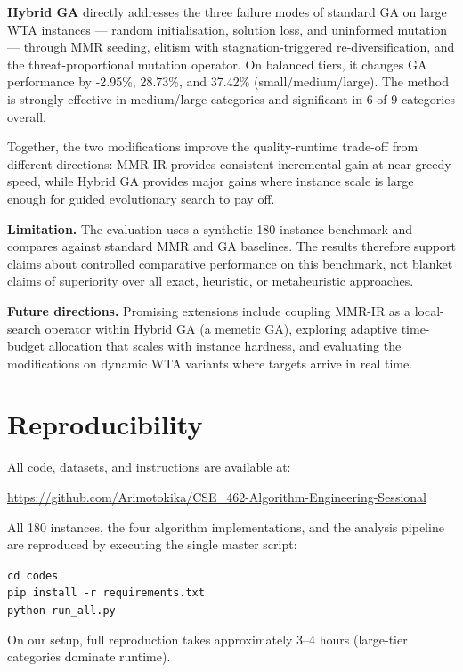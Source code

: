 \documentclass[10pt,conference]{IEEEtran}
\begin{document}
\textbf{Hybrid GA} directly addresses the three failure modes of standard GA
on large WTA instances --- random initialisation, solution loss, and uninformed
mutation --- through MMR seeding, elitism with stagnation-triggered
re-diversification, and the
threat-proportional mutation operator.  On balanced tiers, it changes
GA performance by -2.95\%, 28.73\%, and 37.42\% (small/medium/large).  The
method is strongly effective in medium/large categories and significant in
6 of 9 categories overall.

Together, the two modifications improve the quality-runtime trade-off from
different directions: MMR-IR provides consistent incremental gain at near-greedy
speed, while Hybrid GA provides major gains where instance scale is large
enough for guided evolutionary search to pay off.

\textbf{Limitation.} The evaluation uses a synthetic 180-instance benchmark and
compares against standard MMR and GA baselines.  The results therefore support
claims about controlled comparative performance on this benchmark, not blanket
claims of superiority over all exact, heuristic, or metaheuristic approaches.

\textbf{Future directions.} Promising extensions include coupling MMR-IR as a
local-search operator within Hybrid GA (a memetic GA), exploring adaptive
time-budget allocation that scales with instance hardness, and evaluating the
modifications on dynamic WTA variants where targets arrive in real time.

\section*{Reproducibility}

All code, datasets, and instructions are available at:
\begin{center}
  \url{https://github.com/Arimotokika/CSE_462-Algorithm-Engineering-Sessional}
\end{center}
All 180 instances, the four algorithm implementations, and the analysis
pipeline are reproduced by executing the single master script:
\begin{center}
  \texttt{cd codes}\\
  \texttt{pip install -r requirements.txt}\\
  \texttt{python run\_all.py}
\end{center}
On our setup, full reproduction takes approximately 3--4 hours
(large-tier categories dominate runtime).
\end{document}
